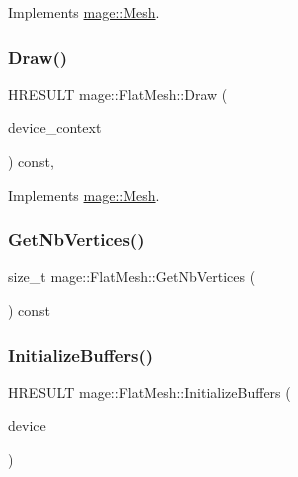 Implements \hyperlink{classmage_1_1_mesh_a0e558e82b0db25b0bbb4abeba9f0fb0f}{mage\+::\+Mesh}.

\hypertarget{classmage_1_1_flat_mesh_a84cf747d30acb8cb12ed730cb1b73a14}{}\label{classmage_1_1_flat_mesh_a84cf747d30acb8cb12ed730cb1b73a14} 
\subsubsection{\texorpdfstring{Draw()}{Draw()}}
{\footnotesize\ttfamily H\+R\+E\+S\+U\+LT mage\+::\+Flat\+Mesh\+::\+Draw (\begin{DoxyParamCaption}\item[{\hyperlink{namespacemage_ae74f374780900893caa5555d1031fd79}{Com\+Ptr}$<$ I\+D3\+D11\+Device\+Context2 $>$}]{device\+\_\+context }\end{DoxyParamCaption}) const\hspace{0.3cm}{\ttfamily [override]}, {\ttfamily [virtual]}}



Implements \hyperlink{classmage_1_1_mesh_a9dff8fa94d28e852fc1e72e6c0a85c6f}{mage\+::\+Mesh}.

\hypertarget{classmage_1_1_flat_mesh_a88f69dd4fa4a1d09db67b6cc32e909ba}{}\label{classmage_1_1_flat_mesh_a88f69dd4fa4a1d09db67b6cc32e909ba} 
\subsubsection{\texorpdfstring{Get\+Nb\+Vertices()}{GetNbVertices()}}
{\footnotesize\ttfamily size\+\_\+t mage\+::\+Flat\+Mesh\+::\+Get\+Nb\+Vertices (\begin{DoxyParamCaption}{ }\end{DoxyParamCaption}) const}

\hypertarget{classmage_1_1_flat_mesh_a8a6e94c0abc2042f08f48ae3241fbd7d}{}\label{classmage_1_1_flat_mesh_a8a6e94c0abc2042f08f48ae3241fbd7d} 
\subsubsection{\texorpdfstring{Initialize\+Buffers()}{InitializeBuffers()}}
{\footnotesize\ttfamily H\+R\+E\+S\+U\+LT mage\+::\+Flat\+Mesh\+::\+Initialize\+Buffers (\begin{DoxyParamCaption}\item[{\hyperlink{namespacemage_ae74f374780900893caa5555d1031fd79}{Com\+Ptr}$<$ I\+D3\+D11\+Device2 $>$}]{device }\end{DoxyParamCaption})\hspace{0.3cm}{\ttfamily [protected]}}

